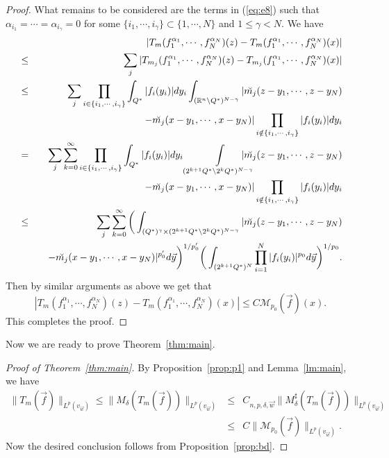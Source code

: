 \documentclass[11pt,oneside,onecolumn]{amsart}
\numberwithin{equation}{section}
\begin{document}
\begin{proof}
What remains to be considered are the terms in (\ref{eq:e8}) such that $\alpha_{i_1}=\cdots=\alpha_{i_\gamma}=0$
for some $\{i_1,\cdots,i_\gamma\}\subset\{1,\cdots,N\}$ and $1\le \gamma<N$. We have
\begin{eqnarray*}
&&|T_m(f_1^{\alpha_1},\cdots,f_N^{\alpha_N})(z)-T_m(f_1^{\alpha_1},\cdots,f_N^{\alpha_N})(x)|\\
&\le&\sum_j|T_{m_j}(f_1^{\alpha_1},\cdots,f_N^{\alpha_N})(z)-T_{m_j}(f_1^{\alpha_1},\cdots,f_N^{\alpha_N})(x)|\\
&\le&\sum_j\prod_{i\in\{i_1,\cdots,i_\gamma\}}\int_{Q^*}|f_i(y_i)|dy_i\int_{({\mathbb{R}}^{n}\setminus Q^*)^{N-\gamma}}|\breve{m_j}(z-y_1, \cdots, z-y_N)\\&&\quad-\breve{m_j}(x-y_1, \cdots, x-y_N)|
\prod_{i\notin \{i_1,\cdots,i_\gamma\}}|f_i(y_i)|dy_i\\
&=&\sum_j\sum_{k=0}^\infty\prod_{i\in\{i_1,\cdots,i_\gamma\}}\int_{Q^*}|f_i(y_i)|dy_i
 \int\limits_{(2^{k+1}Q^*\setminus 2^kQ^*)^{N-\gamma}}
 \hskip -16pt |\breve{m_j}(z-y_1, \cdots, z-y_N)\\&&\quad-\breve{m_j}(x-y_1, \cdots, x-y_N)|
\prod_{i\notin \{i_1,\cdots,i_\gamma\}}|f_i(y_i)|dy_i\\
&\le&\sum_j\sum_{k=0}^\infty\bigg(\int_{(Q^*)^\gamma\times(2^{k+1}Q^*\setminus 2^kQ^*)^{N-\gamma}}|\breve{m_j}(z-y_1, \cdots, z-y_N)\\&&\quad-\breve{m_j}(x-y_1, \cdots, x-y_N)|^{p_0'}d\vec{y}\bigg)^{1/{p_0'}}
\bigg(\int_{(2^{k+1}Q^*)^N}\prod_{i=1}^N|f_i(y_i)|^{p_0}d\vec{y}\bigg)^{1/{p_0}}.
\end{eqnarray*}
Then by similar arguments as above we get that
\[
  |T_m(f_1^{\alpha_1},\cdots,f_N^{\alpha_N})(z)-T_m(f_1^{\alpha_1},\cdots,f_N^{\alpha_N})(x)|\le C\mathcal{M}_{p_0}(\vec{f})(x).
\]
This completes the proof.
\end{proof}

Now we are ready to prove Theorem~\ref{thm:main}.
\begin{proof}[Proof of Theorem~\ref{thm:main}]
By  Proposition~\ref{prop:p1} and Lemma~\ref{lm:main}, we have
\begin{eqnarray*}
 \|T_m (\vec{f})\|_{L^p(v_{\vec{w}})}\le \|M_\delta(T_m (\vec{f}))\|_{L^p(v_{\vec{w}})}
 &\le& C_{n,p,\delta, \vec{w}}\|M_\delta^\sharp(T_m (\vec{f}))\|_{L^p(v_{\vec{w}})}\\
 &\le& C\|\mathcal{M}_{p_0}(\vec{f})\|_{L^p(v_{\vec{w}})}.
\end{eqnarray*}
  Now the desired conclusion follows from
Proposition~\ref{prop:bd}.
\end{proof}
\end{document}
